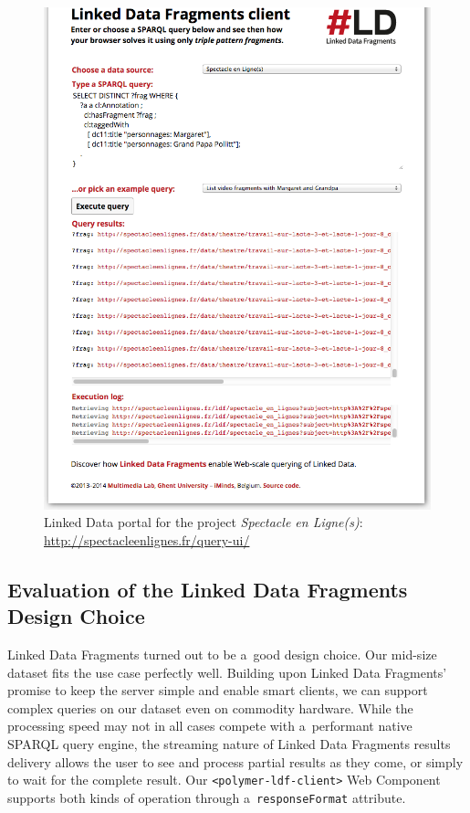 \documentclass[runningheads,a4paper]{llncs}
\begin{document}
\begin{figure}[hbt]
  \centering
  \includegraphics[width=1\textwidth]{linkeddatafragments.png}
  \caption{Linked Data portal for the project \emph{Spectacle en Ligne(s)}: \url{http://spectacleenlignes.fr/query-ui/}}
  \label{fig:ldf}
\end{figure}

\subsection{Evaluation of the Linked Data Fragments Design Choice}

Linked Data Fragments turned out to be a~good design choice.
Our mid-size dataset fits the use case perfectly well.
Building upon Linked Data Fragments' promise to keep the server simple
and enable smart clients, we can support complex queries on our dataset
even on commodity hardware.
While the processing speed may not in all cases compete with a~performant
native SPARQL query engine, the streaming nature of Linked Data Fragments
results delivery allows the user to see and process partial results as they come,
or simply to wait for the complete result.
Our \texttt{<polymer-ldf-client>} Web Component supports both kinds of operation
through a~\texttt{responseFormat} attribute.
\end{document}
